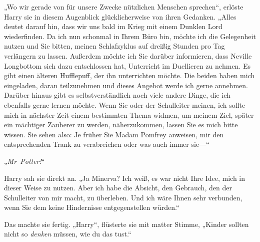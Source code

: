 „Wo wir gerade von für unsere Zwecke nützlichen Menschen sprechen“, erlöste Harry sie in diesem Augenblick glücklicherweise von ihren Gedanken. „Alles deutet darauf hin, dass wir uns bald im Krieg mit einem Dunklen Lord wiederfinden. Da ich nun schonmal in Ihrem Büro bin, möchte ich die Gelegenheit nutzen und Sie bitten, meinen Schlafzyklus auf dreißig Stunden pro Tag verlängern zu lassen. Außerdem möchte ich Sie darüber informieren, dass Neville Longbottom sich dazu entschlossen hat, Unterricht im Duellieren zu nehmen. Es gibt einen älteren Hufflepuff, der ihn unterrichten möchte. Die beiden haben mich eingeladen, daran teilzunehmen und dieses Angebot werde ich gerne annehmen. Darüber hinaus gibt es selbstverständlich noch viele andere Dinge, die ich ebenfalls gerne lernen möchte. Wenn Sie oder der Schulleiter meinen, ich sollte mich in nächster Zeit einem bestimmten Thema widmen, um meinem Ziel, später ein mächtiger Zauberer zu werden, näherzukommen, lassen Sie es mich bitte wissen. Sie sehen also: Je früher Sie Madam Pomfrey anweisen, mir den entsprechenden Trank zu verabreichen oder was auch immer sie—“

„\emph{Mr~Potter!}“

Harry sah sie direkt an. „Ja Minerva? Ich weiß, es war nicht Ihre Idee, mich in dieser Weise zu nutzen. Aber ich habe die Absicht, den Gebrauch, den der Schulleiter von mir macht, zu überleben. Und ich wäre Ihnen sehr verbunden, wenn Sie dem keine Hindernisse entgegenstellen würden.“

Das machte sie fertig. „Harry“, flüsterte sie mit matter Stimme, „Kinder sollten nicht so \emph{denken} müssen, wie du das tust.“

